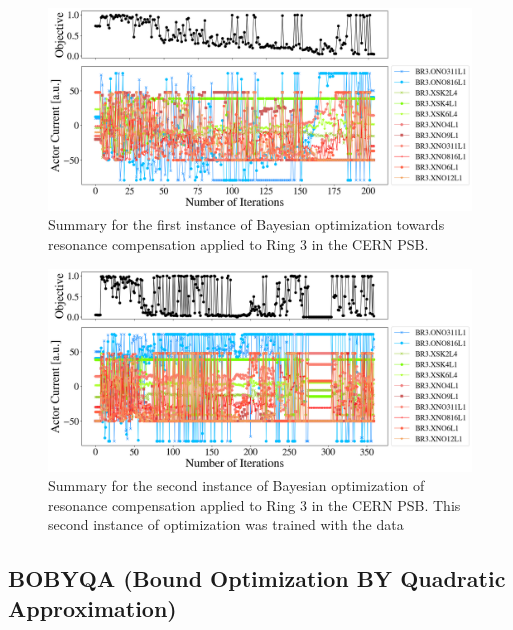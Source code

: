 \begin{figure}[H]
    \centering
    \includegraphics[width=\linewidth]{chapter5/2023_05_02_R3_LHCramp_BayesOpt.png}
    \caption{Summary for the first instance of Bayesian optimization towards resonance compensation applied to Ring 3 in the CERN PSB.}
    \label{fig:bo21}
\end{figure}

\begin{figure}[H]
    \centering
    \includegraphics[width=\linewidth]{chapter5/2023_05_02_R3_LHCramp_BayesOpt_itrtn2.png}
    \caption{Summary for the second instance of Bayesian optimization of resonance compensation applied to Ring 3 in the CERN PSB. This second instance of optimization was trained with the data }
    \label{fig:bo22}
\end{figure}

\subsection{BOBYQA (Bound Optimization BY Quadratic Approximation)}

